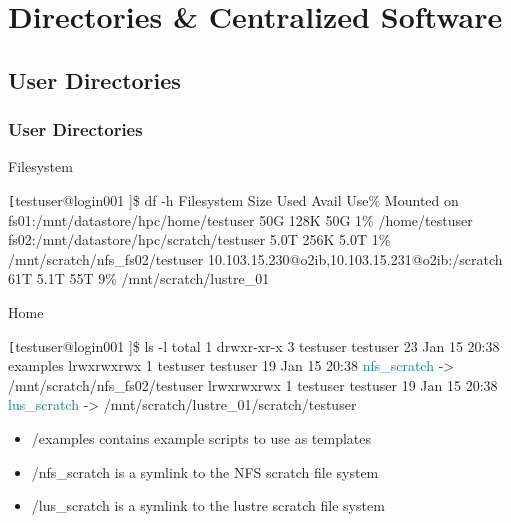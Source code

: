  
\section[Directories \& Centralized Software]{Directories \& Centralized Software }
\subsection{User Directories}
\begin{frame}[fragile]
\frametitle{User Directories}
\begin{block}{Filesystem}
\begin{semiverbatim}\tiny \texttt
[testuser@login001 \ctilde]\$ df -h
Filesystem                                       Size  Used Avail Use\%  Mounted on
fs01:/mnt/datastore/hpc/home/testuser             50G  128K   50G   1\%  /home/testuser
fs02:/mnt/datastore/hpc/scratch/testuser         5.0T  256K  5.0T   1\%  /mnt/scratch/nfs_fs02/testuser
10.103.15.230@o2ib,10.103.15.231@o2ib:/scratch    61T  5.1T  55T   9\%   /mnt/scratch/lustre_01
\end{semiverbatim}
\end{block}
\begin{block}{Home}
\begin{semiverbatim}\tiny \texttt
[testuser@login001 \ctilde]\$ ls -l 
total 1
drwxr-xr-x 3 testuser testuser 23 Jan 15 20:38 examples
lrwxrwxrwx 1 testuser testuser 19 Jan 15 20:38 \textcolor{teal}{nfs_scratch} -> /mnt/scratch/nfs_fs02/testuser
lrwxrwxrwx 1 testuser testuser 19 Jan 15 20:38 \textcolor{teal}{lus_scratch} -> /mnt/scratch/lustre_01/scratch/testuser
\end{semiverbatim}
\end{block}
\begin{itemize}
		\item \ctilde{}/examples contains example scripts to use as templates
		\item \ctilde{}/nfs\_scratch is a symlink to the NFS scratch file system
		\item \ctilde{}/lus\_scratch is a symlink to the lustre scratch file system
\end{itemize}
\end{frame}


